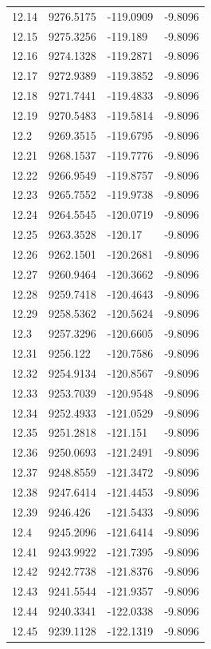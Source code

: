 \begin{table}[H]
\begin{tabular}{llll}
12.14 & 9276.5175 & -119.0909 & -9.8096 \\
12.15 & 9275.3256 & -119.189 & -9.8096 \\
12.16 & 9274.1328 & -119.2871 & -9.8096 \\
12.17 & 9272.9389 & -119.3852 & -9.8096 \\
12.18 & 9271.7441 & -119.4833 & -9.8096 \\
12.19 & 9270.5483 & -119.5814 & -9.8096 \\
12.2 & 9269.3515 & -119.6795 & -9.8096 \\
12.21 & 9268.1537 & -119.7776 & -9.8096 \\
12.22 & 9266.9549 & -119.8757 & -9.8096 \\
12.23 & 9265.7552 & -119.9738 & -9.8096 \\
12.24 & 9264.5545 & -120.0719 & -9.8096 \\
12.25 & 9263.3528 & -120.17 & -9.8096 \\
12.26 & 9262.1501 & -120.2681 & -9.8096 \\
12.27 & 9260.9464 & -120.3662 & -9.8096 \\
12.28 & 9259.7418 & -120.4643 & -9.8096 \\
12.29 & 9258.5362 & -120.5624 & -9.8096 \\
12.3 & 9257.3296 & -120.6605 & -9.8096 \\
12.31 & 9256.122 & -120.7586 & -9.8096 \\
12.32 & 9254.9134 & -120.8567 & -9.8096 \\
12.33 & 9253.7039 & -120.9548 & -9.8096 \\
12.34 & 9252.4933 & -121.0529 & -9.8096 \\
12.35 & 9251.2818 & -121.151 & -9.8096 \\
12.36 & 9250.0693 & -121.2491 & -9.8096 \\
12.37 & 9248.8559 & -121.3472 & -9.8096 \\
12.38 & 9247.6414 & -121.4453 & -9.8096 \\
12.39 & 9246.426 & -121.5433 & -9.8096 \\
12.4 & 9245.2096 & -121.6414 & -9.8096 \\
12.41 & 9243.9922 & -121.7395 & -9.8096 \\
12.42 & 9242.7738 & -121.8376 & -9.8096 \\
12.43 & 9241.5544 & -121.9357 & -9.8096 \\
12.44 & 9240.3341 & -122.0338 & -9.8096 \\
12.45 & 9239.1128 & -122.1319 & -9.8096 \\

\end{tabular}
\end{table}
